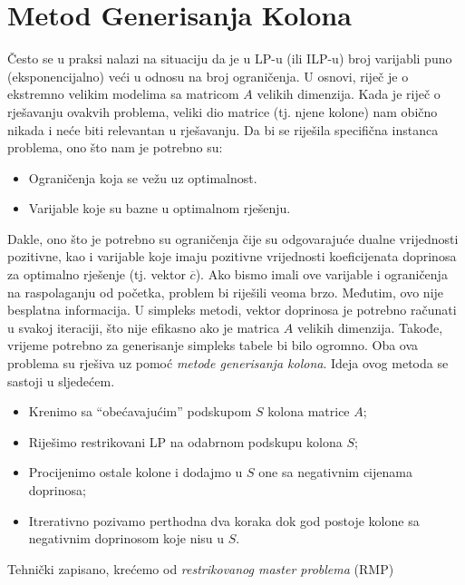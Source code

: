 \documentclass[a4paper, utf8, 11pt, colorlinks]{book}
\begin{document}
\section{Metod Generisanja Kolona}%

Često se u praksi nalazi na situaciju da je u LP-u (ili ILP-u) broj varijabli puno (eksponencijalno) veći  u odnosu na broj ograničenja. U osnovi, riječ je o ekstremno velikim modelima sa matricom $A$ velikih dimenzija. Kada je riječ o rješavanju ovakvih problema, veliki dio matrice (tj. njene kolone) nam obično nikada i neće biti relevantan u rješavanju. Da bi se riješila specifična instanca problema, ono što nam je potrebno su:
\begin{itemize}
    \item Ograničenja koja se vežu uz optimalnost.
    \item Varijable koje su bazne u optimalnom rješenju.
\end{itemize}
Dakle, ono što je potrebno su ograničenja čije su odgovarajuće dualne vrijednosti pozitivne, kao i varijable koje imaju pozitivne vrijednosti koeficijenata doprinosa za optimalno rješenje (tj. vektor  $\overline{c}$). Ako bismo imali ove varijable i ograničenja na raspolaganju od početka, problem bi riješili veoma brzo. Međutim, ovo nije  besplatna informacija.  U simpleks metodi, vektor doprinosa je potrebno računati u svakoj iteraciji, što nije efikasno ako je matrica $A$ velikih dimenzija. Takođe, vrijeme potrebno za generisanje simpleks tabele bi bilo ogromno.  Oba ova problema su rješiva uz pomoć \emph{metode generisanja kolona}.  Ideja ovog metoda se sastoji u sljedećem. 
\begin{itemize}
    \item Krenimo sa ``obećavajućim'' podskupom $S$ kolona matrice $A$; 
    \item Riješimo restrikovani LP na odabrnom podskupu kolona $S$; 
    \item Procijenimo ostale kolone i dodajmo u $S$ one sa negativnim 
          cijenama doprinosa;
    \item Itrerativno pozivamo perthodna dva koraka dok god postoje kolone   sa negativnim doprinosom koje nisu u $S$.
\end{itemize}
Tehnički zapisano, krećemo od \emph{restrikovanog master problema} (RMP)
\end{document}
